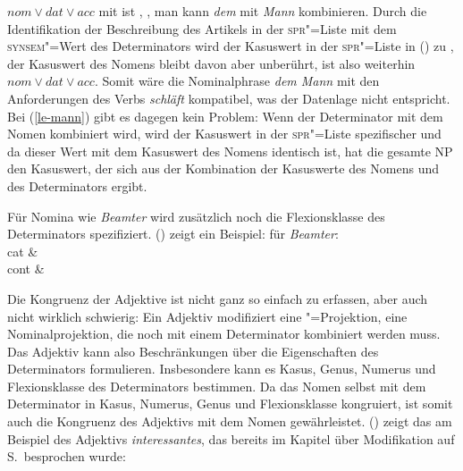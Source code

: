 $nom \vee dat \vee acc$ mit  ist , \dash, man kann \emph{dem}
mit \emph{Mann} kombinieren. Durch die Identifikation der Beschreibung des Artikels
in der \textsc{spr}"=Liste mit dem \textsc{synsem}"=Wert des Determinators wird der Kasuswert
in der \textsc{spr}"=Liste in () zu , der Kasuswert des Nomens bleibt
davon aber unberührt, ist also weiterhin $nom \vee dat \vee acc$. Somit wäre die Nominalphrase
\emph{dem Mann} mit den Anforderungen des Verbs \emph{schläft} kompatibel, was der
Datenlage nicht entspricht.
Bei (\ref{le-mann}) gibt es dagegen kein Problem: Wenn der Determinator mit dem Nomen
kombiniert wird, wird der Kasuswert in der \textsc{spr}"=Liste spezifischer und da dieser
Wert mit dem Kasuswert des Nomens identisch ist, hat die gesamte NP den Kasuswert, der
sich aus der Kombination der Kasuswerte des Nomens und des Determinators ergibt.
\largerpage

Für Nomina wie \emph{Beamter} wird zusätzlich noch die Flexionsklasse des Determinators
spezifiziert. () zeigt ein Beispiel:
\ea
\label{le-beamter}%
\localw für \emph{Beamter}:\\
\ms
{ cat &  \\
  cont &  \\
}
\z

\noindent
Die Kongruenz der Adjektive ist nicht ganz so einfach zu erfassen, aber auch nicht wirklich schwierig:
Ein Adjektiv modifiziert eine \nbar"=Projektion, \dash eine Nominalprojektion, die noch mit einem Determinator
kombiniert werden muss. Das Adjektiv kann also Beschränkungen über die Eigenschaften des Determinators
formulieren. Insbesondere kann es Kasus, Genus, Numerus und Flexionsklasse des Determinators bestimmen.
Da das Nomen selbst mit dem Determinator in Kasus, Numerus, Genus und Flexionsklasse kongruiert, ist somit
auch die Kongruenz des Adjektivs mit dem Nomen gewährleistet. () zeigt das am Beispiel
des Adjektivs \emph{interessantes}, das bereits im Kapitel über Modifikation auf S.\,\pageref{le-kleinen-sem}
besprochen wurde:
\largerpage[2]

